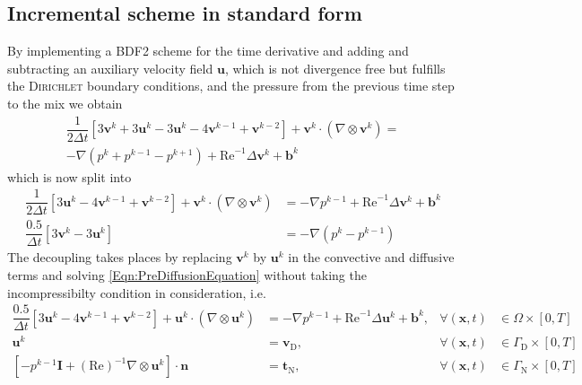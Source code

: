 \documentclass[]{scrartcl}
\newcommand{\bs}[1]{\boldsymbol{#1}}
\begin{document}
\subsection{Incremental scheme in standard form}
By implementing a BDF2 scheme for the time derivative and adding and subtracting an auxiliary velocity field $\bs{u}$, which is not divergence free but fulfills the \textsc{Dirichlet} boundary conditions, and the pressure from the previous time step to the mix we obtain
\begin{equation*}
\begin{split}
	\dfrac{1}{2\Delta t} \left[3\bs{v}^{k} + 3\bs{u}^{k} - 3\bs{u}^{k} - 4\bs{v}^{k-1} + \bs{v}^{k-2}\right]  + \bs{v}^{k} \cdot (\nabla \otimes \bs{v}^{k})= \\  -\nabla (p^{k} + p^{k-1} - p^{k+1}) +  \mathrm{Re}^{-1} \Delta \bs{v}^{k} + \bs{b}^{k}
\end{split}
\end{equation*}
which is now split into
\begin{subequations}
	\begin{align}
		\label{Eqn:PreDiffusionEquation}
		\dfrac{1}{2\Delta t} \left[3\bs{u}^{k} - 4\bs{v}^{k-1} + \bs{v}^{k-2}\right]  + \bs{v}^{k} \cdot (\nabla \otimes \bs{v}^{k}) &= -\nabla p^{k-1} +  \mathrm{Re}^{-1} \Delta \bs{v}^{k} + \bs{b}^{k} 
		\\
		\label{Eqn:PreProjectionEquation}
		\dfrac{0.5}{\Delta t} \left[3\bs{v}^{k} - 3\bs{u}^{k} \right] &= -\nabla (p^{k} - p^{k-1})
	\end{align}
\end{subequations}
The decoupling takes places by replacing $\bs{v}^{k}$ by $\bs{u}^{k}$ in the convective and diffusive terms and solving \cref{Eqn:PreDiffusionEquation} without taking the incompressibilty condition in consideration, i.e.
\begin{equation*}
	\begin{aligned}
		\dfrac{0.5}{\Delta t} \left[3\bs{u}^{k} - 4\bs{v}^{k-1} + \bs{v}^{k-2}\right]  + \bs{u}^{k} \cdot (\nabla \otimes \bs{u}^{k}) &= -\nabla p^{k-1} +  \mathrm{Re}^{-1} \Delta \bs{u}^{k} + \bs{b}^{k}, &\forall (\bs{x}, t) &\in \Omega \times \left[0, T \right]  \\
		\bs{u}^{k} &= \bs{v}_\textrm{D}, &\forall (\bs{x}, t) &\in \Gamma_\textrm{D} \times \left[0, T \right] \\
		[-p^{k-1} \bs{I} + (\textrm{Re})^{-1}\nabla \otimes \bs{u}^{k}]\cdot \bs{n} &= \bs{t}_\textrm{N}, &\forall \left(\bs{x}, t\right) &\in \Gamma_\textrm{N} \times \left[0, T \right]
	\end{aligned}
\end{equation*}
\end{document}
